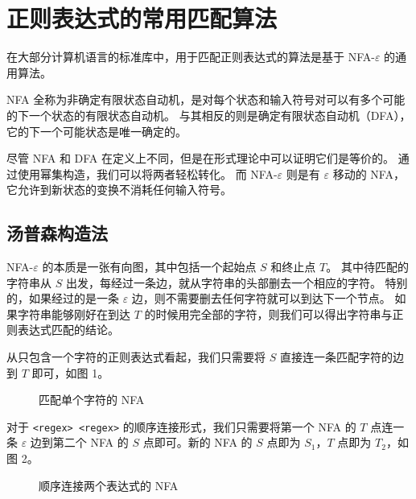 \documentclass[hyperref,UTF8,12pt,a4paper]{ctexart}
\begin{document}
\section{正则表达式的常用匹配算法}

在大部分计算机语言的标准库中，用于匹配正则表达式的算法是基于 NFA-$\varepsilon$ 的通用算法。

NFA 全称为非确定有限状态自动机，是对每个状态和输入符号对可以有多个可能的下一个状态的有限状态自动机。
与其相反的则是确定有限状态自动机（DFA），它的下一个可能状态是唯一确定的。

尽管 NFA 和 DFA 在定义上不同，但是在形式理论中可以证明它们是等价的。
通过使用幂集构造，我们可以将两者轻松转化。
而 NFA-$\varepsilon$ 则是有 $\varepsilon$ 移动的 NFA，它允许到新状态的变换不消耗任何输入符号。

\subsection{汤普森构造法}

NFA-$\varepsilon$ 的本质是一张有向图，其中包括一个起始点 $S$ 和终止点 $T$。
其中待匹配的字符串从 $S$ 出发，每经过一条边，就从字符串的头部删去一个相应的字符。
特别的，如果经过的是一条 $\varepsilon$ 边，则不需要删去任何字符就可以到达下一个节点。
如果字符串能够刚好在到达 $T$ 的时候用完全部的字符，则我们可以得出字符串与正则表达式匹配的结论。

从只包含一个字符的正则表达式看起，我们只需要将 $S$ 直接连一条匹配字符的边到 $T$ 即可，如图 1。

\begin{figure}[h]
	\centering
	\caption{匹配单个字符的 NFA}
\end{figure}

对于 \verb!<regex> <regex>! 的顺序连接形式，我们只需要将第一个 NFA 的 $T$ 点连一条 $\varepsilon$ 边到第二个 NFA 的 $S$ 点即可。新的 NFA 的 $S$ 点即为 $S_1$，$T$ 点即为 $T_2$，如图 2。

\begin{figure}[h]
	\centering
	\caption{顺序连接两个表达式的 NFA}
\end{figure}
\end{document}
